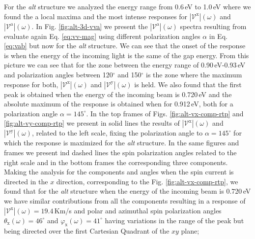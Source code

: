\documentclass[prb,11pt,tightenlines,twocolumn,aps]{revtex4-1}
\begin{document}
For the \emph{alt} structure we analyzed the energy range from 0.6\,eV to
1.0\,eV where we found the a local maxima and the most intense responses for
$|\mathcal{V}^{\mathrm{x}}|(\omega)$ and $|\mathcal{V}^{\mathrm{a}}|(\omega)$.
In Fig. \ref{fig:alt-3d-vva} we present the $|\mathcal{V}^{\mathrm{a}}|(\omega)$
spectra resulting from evaluate again Eq. \eqref{eq:vv-mag} using different
polarization angles $\alpha$ in Eq. \eqref{eq:vab} but now for the \emph{alt}
structure. We can see that the onset of the response is when the energy of the
incoming light is the same of the gap energy.
%
From this picture we can see that for the zone between the energy range of
0.90\,eV-0.93\,eV and polarization angles between 120$^{\circ}$ and
150$^{\circ}$ is the zone where the maximum response for both,
$|\mathcal{V}^{\mathrm{x}}|(\omega)$ and $|\mathcal{V}^{\mathrm{y}}|(\omega)$ is
held. We also found that the first peak is obtained when the energy of the
incoming beam is 0.720\,eV and  the absolute maximum of the response is obtained
when for 0.912\,eV, both for a polarization angle $\alpha = 145^{\circ}$.
In the top frames of Figs. \ref{fig:alt-vx-comp-rtp}  and 
%
\ref{fig:alt-vy-comp-rtp} we present in solid lines the results of
$|\mathcal{V}^{\mathrm{x}}|(\omega)$ and $|\mathcal{V}^{\mathrm{y}}|(\omega)$,
related to the left scale, fixing the polarization angle to $\alpha=145^{\circ}$
for which the response is maximized for the \emph{alt} structure. In the same
figures and frames we present ind dashed lines the spin polarization angles
related to the right scale and in the bottom frames the corresponding three
components.
% 
Making the analysis for the components and angles when the spin current is
directed in the $x$ direction, corresponding to the Fig. 
% 
\ref{fig:alt-vx-comp-rtp}, we found that for the \emph{alt} structure when the
energy of the incoming beam is 0.720\,eV we have similar contributions from all
the components resulting in a response of
$|\mathcal{V}^{\mathrm{x}}|(\omega)=19.4$\,Km/s and polar and azimuthal spin
polarization angles $\theta_{\mathrm{x}}(\omega)=46^{\circ}$ and
$\varphi_{\mathrm{x}}(\omega)=41^{\circ}$ having variations in the range of the
peak but being directed over the first Cartesian Quadrant of the $xy$ plane;
\end{document}
